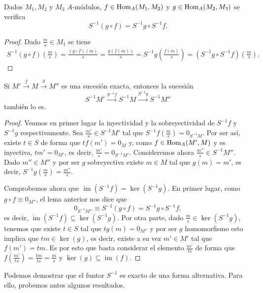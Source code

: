 \documentclass[../main.tex]{subfiles}
\begin{document}
	\begin{lemma}
		Dados $M_1, M_2$ y $M_3$ $A$-módulos, $f\in\text{Hom}_A(M_1,M_2)$ y $g\in\text{Hom}_A(M_2,M_3)$ se verifica
		$$S^{-1}(g\circ f)=S^{-1}g\circ S^{-1}f.$$
	\end{lemma}

	\begin{proof}
		Dado $\frac{m}{s}\in M_1$ se tiene
		\begin{align*}
		S^{-1}(g\circ f)\left(\frac{m}{s}\right)=\frac{(g\circ f)(m)}{s}=\frac{g(f(m))}{s}=S^{-1}{g}\left(\frac{f(m)}{s}\right)=(S^{-1}{g}\circ S^{-1}{f})\left(\frac{m}{s}\right).
		\end{align*}
	\end{proof}

	\begin{proposition}
		Si $M'\overset{f}{\longrightarrow}M\overset{g}{\longrightarrow}M''$ es una sucesión exacta, entonces la sucesión $$S^{-1}M'\overset{S^{-1}f}{\longrightarrow}S^{-1}M\overset{S^{-1}g}{\longrightarrow}S^{-1}M''$$ también lo es.
	\end{proposition}

	\begin{proof}
		Veamos en primer lugar la inyectividad y la sobreyectividad de $S^{-1}f$ y $S^{-1}g$ respectivamente. Sea $\frac{m'}{s}\in S^{-1}M'$ tal que $S^{-1}f\left(\frac{m}{s}\right)=0_{S^{-1}M}$. Por ser así, existe $t\in S$ de forma que $tf(m')=0_M$ y, como $f\in\text{Hom}_A(M',M)$ y es inyectiva, $tm'=0_{M'}$, es decir, $\frac{m'}{s}=0_{S^{-1}M'}$.
		Consideremos ahora $\frac{m''}{s}\in S^{-1}M''$. Dado $m''\in M''$ y por ser $g$ sobreyectiva existe $m\in M$ tal que $g(m)=m'$, es decir, $S^{-1}g\left(\frac{m}{s}\right)=\frac{m''}{s}$.

		Comprobemos ahora que $\operatorname{im}(S^{-1}f)=\ker (S^{-1}g)$. En primer lugar, como $g\circ f\equiv 0_{M''}$, el lema anterior nos dice que
		$$0_{S^{-1} M''}\equiv S^{-1}(g\circ f)=S^{-1} g\circ S^{-1} f,$$
		es decir, $\operatorname{im} (S^{-1}f)\subseteq \ker(S^{-1}g)$. Por otra parte, dado $\frac{m}{s}\in\ker(S^{-1}g)$, tenemos que existe $t\in S$ tal que $tg(m)=0_{M''}$ y por ser $g$ homomorfismo esto implica que $tm\in\ker(g)$, es decir, existe a su vez $m'\in M'$ tal que $f(m')=tm$. Es por esto que basta considerar el elemento $\frac{m'}{ts}$ de forma que $f(\frac{m'}{ts})=\frac{tm}{ts}=\frac{m}{s}$ y $\ker(g)\subseteq\operatorname{im}(f)$.
	\end{proof}

	Podemos demostrar que el funtor $S^{-1}$ es exacto de una forma alternativa. Para ello, probemos antes algunos resultados.
\end{document}
